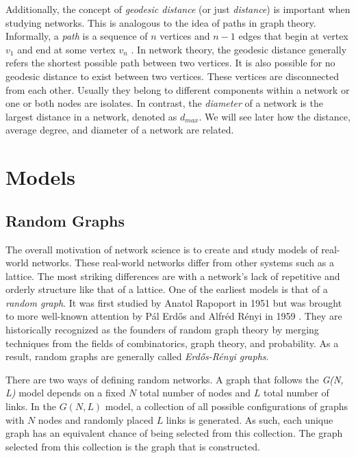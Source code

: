 \documentclass{article}
\begin{document}
Additionally, the concept of \textit{geodesic distance} (or just \textit{distance}) is important when studying networks.  This is analogous to the idea of paths in graph theory.  Informally, a \textit{path} is a sequence of $n$ vertices and $n-1$ edges that begin at vertex $v_1$ and end at some vertex $v_n$ \cite{discrete}. In network theory, the geodesic distance generally refers the shortest possible path between two vertices.  It is also possible for no geodesic distance to exist between two  vertices.  These vertices are disconnected from each other.  Usually they belong to different components within a network or one or both nodes are isolates.  In contrast, the \textit{diameter} of a network is the largest distance in a network, denoted as $d_{max}$.  We will see later how the distance, average degree, and diameter of a network are related.






\section{Models}

\subsection{Random Graphs}

The overall motivation of network science  is to create and study models of real-world networks. These real-world networks differ from other systems such as a lattice.  The most striking differences are with a network's lack of repetitive and orderly structure like that of a lattice.  One of the earliest models is that of a \textit{random graph}.  It was first studied by Anatol Rapoport in 1951 but was brought to more well-known attention by P\' al Erd\H os and Alfr\' ed R\' enyi in 1959 \cite{ns}.  They are historically recognized as the founders of random graph theory by merging techniques from the fields of combinatorics, graph theory, and probability.  As a result, random graphs are generally called \textit{Erd\H os-R\' enyi graphs}.

There are two ways of defining random networks.  A graph that follows the \textit{G(N, L)} model depends on a fixed $N$ total number of nodes and $L$ total number of links.  In the $G(N,L)$ model, a collection of all possible configurations of graphs with $N$ nodes and randomly placed $L$ links is generated. As such, each unique graph has an equivalent chance of being selected from this collection. The graph selected from this collection is the graph that is constructed.
\end{document}
